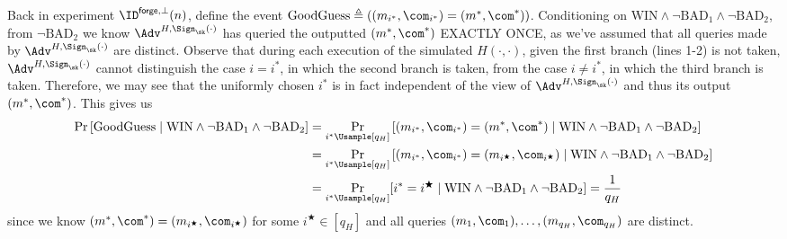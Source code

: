 \begin{answer}
    Back in experiment $\ID^{\mathsf{forge},\bot}(n)$, define the event $\textrm{GoodGuess}\triangleq \left( (m_{i^\ast}, \com_{i^\ast})=(m^\ast, \com^\ast) \right)$. Conditioning on $\textrm{WIN}\land \neg \textrm{BAD}_1\land \neg \textrm{BAD}_2$, from $\neg \textrm{BAD}_2$ we know $\Adv^{H,\Sign_\sk(\cdot)}$ has queried the outputted $(m^\ast, \com^\ast)$ EXACTLY ONCE, as we've assumed that all queries made by $\Adv^{H,\Sign_\sk(\cdot)}$ are distinct. Observe that during each execution of the simulated $H(\cdot, \cdot)$, given the first branch (lines 1-2) is not taken,  $\Adv^{H,\Sign_\sk(\cdot)}$ cannot distinguish the case $i = i^\ast$, in which the second branch is taken, from the case $i \neq i^\ast$, in which the third branch is taken. Therefore, we may see that the uniformly chosen $i^\ast$ is in fact independent of the view of $\Adv^{H,\Sign_\sk(\cdot)}$ and thus its output $(m^\ast, \com^\ast)$. This gives us
    \begin{align}\label{eq:p2-7}
        \Pr\left[\textrm{GoodGuess} \mid \textrm{WIN}\land \neg \textrm{BAD}_1\land \neg \textrm{BAD}_2\right]
        &= \Pr_{i^\ast\Usample [q_H]}\left[(m_{i^\ast}, \com_{i^\ast})=(m^\ast, \com^\ast) \mid \textrm{WIN}\land \neg \textrm{BAD}_1\land \neg \textrm{BAD}_2\right]\notag\\
        &= \Pr_{i^\ast\Usample [q_H]}\left[(m_{i^\ast}, \com_{i^\ast})=(m_{i^\bigstar}, \com_{i^\bigstar}) \mid \textrm{WIN}\land \neg \textrm{BAD}_1\land \neg \textrm{BAD}_2\right]\notag\\
        &= \Pr_{i^\ast\Usample [q_H]}[i^\ast = i^\bigstar \mid \textrm{WIN}\land \neg \textrm{BAD}_1\land \neg \textrm{BAD}_2] = \frac{1}{q_H}
    \end{align}
    since we know $(m^\ast, \com^\ast)=(m_{i^\bigstar}, \com_{i^\bigstar})$ for some $i^\bigstar\in [q_H]$ and all queries $(m_1, \com_1),\ldots, (m_{q_H}, \com_{q_H})$ are distinct.



\end{answer}
